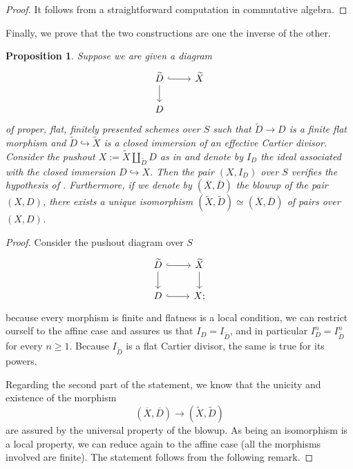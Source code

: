 \documentclass{alggeom}
\numberwithin{equation}{section}
\numberwithin{subsection}{section}
\newtheorem{proposition}[theorem]{Proposition}
\theoremstyle{definition}
\theoremstyle{remark}
\newcommand\into{\hookrightarrow}
\begin{document}
\begin{proof}
	It follows from a straightforward computation in commutative algebra.
\end{proof}	

Finally, we prove that the two constructions are one the inverse of the other.

\begin{proposition}\label{prop:pushout-blowup}
	Suppose we are given a diagram
	$$
	\begin{tikzcd}
		\widetilde{D} \arrow[d] \arrow[r, hook] & \widetilde{X} \\
		D                                       &              
	\end{tikzcd}
	$$ of proper, flat, finitely presented schemes over $S$ such that $\widetilde{D} \rightarrow D$ is a finite flat morphism and $\widetilde{D}\into \widetilde{X}$ is a closed immersion of an effective Cartier divisor. Consider the pushout $X:=\widetilde{X}\amalg_{\widetilde{D}}D$ as in  and denote by $I_D$ the ideal associated with the closed immersion $D\into X$. Then the pair $(X,I_D)$ over $S$ verifies the hypothesis of . Furthermore, if we denote by $(\overline{X},\overline{D})$ the blowup of the pair $(X,D)$, there exists a unique isomorphism $(\widetilde{X},\widetilde{D}) \simeq (\overline{X},\overline{D})$ of pairs over $(X,D)$.
\end{proposition}

\begin{proof}
	Consider the pushout diagram over $S$
	$$
	\begin{tikzcd}
		\widetilde{D} \arrow[d] \arrow[r, hook] & \widetilde{X} \arrow[d] \\
		D \arrow[r, hook]                       & X;                     
	\end{tikzcd}
	$$
	because every morphism is finite and flatness is a local condition, we can restrict ourself to the affine case and  assures us that $I_D=I_{\widetilde{D}}$, and in particular $I_D^n=I_{\widetilde{D}}^n$ for every $n\geq 1$. Because $I_{\widetilde{D}}$ is a flat Cartier divisor, the same is true for its powers.
	
	Regarding the second part of the statement, we know that the unicity and existence of the morphism $$(\overline{X},\overline{D}) \longrightarrow (\widetilde{X},\widetilde{D})$$ 
	are assured by the universal property of the blowup. As being an isomorphism is a local property, we can reduce again to the affine case (all the morphisms involved are finite). The statement follows from the following remark.
\end{proof}
\end{document}

